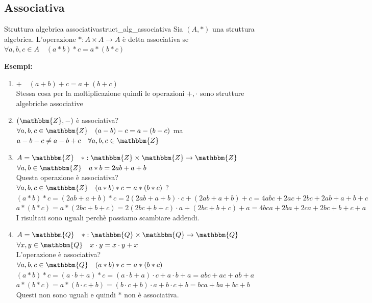 \documentclass[12pt, letterpaper]{report}
\newcounter{definition}
\newcommand{\nmu}{}
\begin{document}
		\subsection{Associativa}
		\begin{definition}{\nmu Struttura algebrica associativa}{struct_alg_associativa}
			Sia $(A, *)$ una struttura algebrica. L'operazione $*: A \times A\to A$ è detta associativa se $\forall a,b,c \in A \quad (a * b) * c = a * (b * c)$
		\end{definition}
		\textbf{Esempi:}
		\begin{enumerate}
			\item $+ \quad (a+b) + c = a + (b + c)$ \\
			Stessa cosa per la moltiplicazione quindi le operazioni $+, \cdot$ sono strutture algebriche associative
			\item $(\mathbbm{Z}, -)$ è associativa? \\
			$\forall a,b,c \in \mathbbm{Z} \quad (a-b) -c = a - (b-c)$ ma $a-b-c \neq a-b+c \quad \forall a,b,c \in \mathbbm{Z}$
			\item $A = \mathbbm{Z} \quad *: \mathbbm{Z} \times \mathbbm{Z} \to \mathbbm{Z}$ \\
			$\forall a,b \in \mathbbm{Z} \quad a*b = 2ab + a + b$ \\
			Questa operazione è associativa? \\
			$\forall a,b,c \in \mathbbm{Z} \quad (a*b)*c = a*(b*c)$ ? \\
			$(a*b)*c = (2ab + a + b)*c = 2(2ab+a+b)\cdot c + (2ab+a+b)+c = 4abc + 2ac+ 2bc+2ab+a+b+c$ \\
			$a*(b*c) = a*(2bc + b + c) = 2(2bc+b+c) \cdot a + (2bc+b+c)+a = 4bca + 2ba + 2ca + 2bc+b+c+a$ \\
			I risultati sono uguali perchè possiamo scambiare addendi.
			\item $A=\mathbbm{Q} \quad *:\mathbbm{Q} \times \mathbbm{Q} \to \mathbbm{Q}$ \\
			$\forall x,y \in \mathbbm{Q} \quad x \cdot y = x \cdot y + x$ \\
			L'operazione è associativa? \\
			$\forall a,b,c \in \mathbbm{Q} \quad (a*b)*c = a*(b*c)$ \\
			$(a*b)*c = (a \cdot b + a)*c = (a \cdot b + a)\cdot c + a \cdot b + a = abc + ac + ab + a$  \\
			$a*(b*c) = a*(b \cdot c + b) = (b \cdot c + b) \cdot a + b \cdot c + b = bca + ba + bc + b$ \\
			Questi non sono uguali e quindi $*$ non è associativa.
		\end{enumerate}
\end{document}
